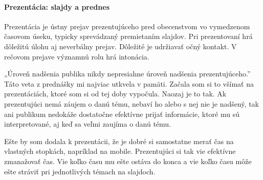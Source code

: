 \documentclass[10pt,twoside,slovak,a4paper]{article}
\begin{document}
\paragraph{Prezentácia: slajdy a prednes}
Prezentácia je ústny prejav prezentujúceho pred obecenstvom vo vymedzenom časovom úseku, typicky sprevádzaný premietaním slajdov. Pri prezentovaní hrá dôležitú úlohu aj neverbálny prejav. Dôležité je udržiavať očný kontakt. V rečovom prejave významnú rolu hrá intonácia.

„Úroveň nadšenia publika nikdy nepresiahne úroveň nadšenia prezentujúceho.” Táto veta z prednášky mi najviac utkvela v pamäti. Začala som si to všímať na prezentáciách, ktoré som si od tej doby vypočula. Naozaj je to tak. Ak prezentujúci nemá záujem o danú tému, nebaví ho alebo s nej nie je nadšený, tak ani publikum nedokáže dostatočne efektívne prijať informácie, ktoré mu sú interpretované, aj keď sa veľmi zaujíma o danú tému.

Ešte by som dodala k prezentácii, že je dobré si samostatne merať čas na vlastných stopkách, napríklad na mobile. Prezentujúci si tak vie efektívne zmanažovať čas. Vie koľko času mu ešte ostáva do konca a vie koľko času môže ešte stráviť pri jednotlivých témach na slajdoch. 



\end{document}
